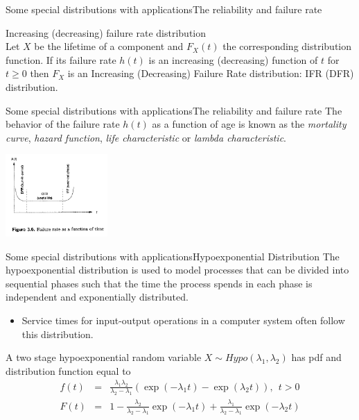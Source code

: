 \documentclass[handout]{beamer}
\begin{document}
\begin{frame}{Some special distributions with applications}{The reliability and failure rate}
\begin{definition}
Increasing (decreasing) failure rate distribution\\
Let $X$ be the lifetime of a component and $F_X(t)$ the corresponding distribution function.
If its failure rate $h(t)$ is an increasing (decreasing) function of $t$ for $t \geq 0$ then $F_X$ is an Increasing (Decreasing) Failure 
Rate distribution: IFR (DFR) distribution.
\end{definition}

\end{frame}
\begin{frame}{Some special distributions with applications}{The reliability and failure rate}
 The behavior of the failure rate $h(t)$ as a function of age is known as the \textit{mortality curve}, 
\textit{hazard function}, \textit{life characteristic} or \textit{lambda characteristic}.
\begin{center}
 \includegraphics[width=110pt,keepaspectratio=true]{./Figura3_6.png}
\end{center}

\end{frame}


\begin{frame}{Some special distributions with applications}{Hypoexponential Distribution}
The hypoexponential distribution is used to model processes that can be divided into sequential 
phases such that the time the process spends in each phase is independent and exponentially distributed.
\begin{itemize}
 \item Service times for input-output operations in a computer system often follow this distribution.
\end{itemize}
A two stage hypoexponential random variable $X \sim Hypo(\lambda_1,\lambda_2)$ has pdf and distribution function equal to
 \begin{eqnarray*}
f(t) &=& \frac{\lambda_1 \lambda_2}{\lambda_2 - \lambda_1} ( \exp(- \lambda_1 t) - \exp(\lambda_2 t) ), \ \ t> 0 \\ 
F(t) &=& 1 - \frac{\lambda_2}{\lambda_2 - \lambda_1} \exp(- \lambda_1 t) + \frac{\lambda_1}{\lambda_2 - \lambda_1}\exp(- \lambda_2 t)
 \end{eqnarray*}

\end{frame}
\end{document}
